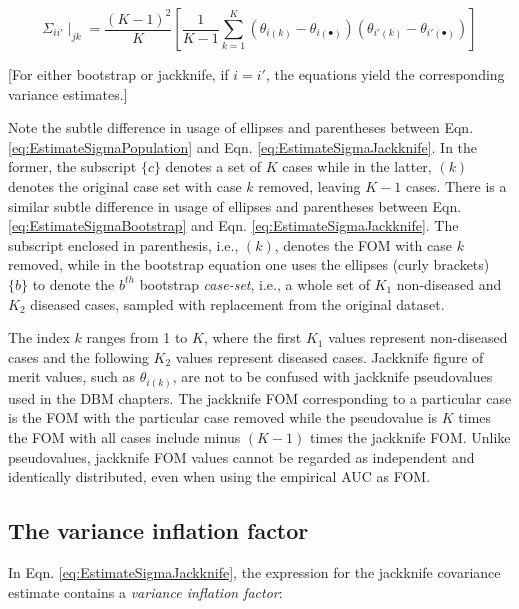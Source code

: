 \documentclass[
]{book}
\begin{document}
\begin{equation}
\Sigma_{ii'}\mid_{jk} =\frac{(K-1)^2}{K} \left [ \frac{1}{K-1}\sum_{k=1}^{K} \left ( \theta_{i(k)} - \theta_{i(\bullet)} \right) \left ( \theta_{i'(k)} - \theta_{i'(\bullet)} \right) \right ]
\label{eq:EstimateSigmaJackknife}
\end{equation}

{[}For either bootstrap or jackknife, if \(i = i'\), the equations yield the corresponding variance estimates.{]}

Note the subtle difference in usage of ellipses and parentheses between Eqn. \eqref{eq:EstimateSigmaPopulation} and Eqn. \eqref{eq:EstimateSigmaJackknife}. In the former, the subscript \(\{c\}\) denotes a set of \(K\) cases while in the latter, \((k)\) denotes the original case set with case \(k\) removed, leaving \(K-1\) cases. There is a similar subtle difference in usage of ellipses and parentheses between Eqn. \eqref{eq:EstimateSigmaBootstrap} and Eqn. \eqref{eq:EstimateSigmaJackknife}. The subscript enclosed in parenthesis, i.e., \((k)\), denotes the FOM with case \(k\) removed, while in the bootstrap equation one uses the ellipses (curly brackets) \(\{b\}\) to denote the \(b^{th}\) bootstrap \emph{case-set}, i.e., a whole set of \(K_1\) non-diseased and \(K_2\) diseased cases, sampled with replacement from the original dataset.

The index \(k\) ranges from 1 to \(K\), where the first \(K_1\) values represent non-diseased cases and the following \(K_2\) values represent diseased cases. Jackknife figure of merit values, such as \(\theta_{i(k)}\), are not to be confused with jackknife pseudovalues used in the DBM chapters. The jackknife FOM corresponding to a particular case is the FOM with the particular case removed while the pseudovalue is \(K\) times the FOM with all cases include minus \((K-1)\) times the jackknife FOM. Unlike pseudovalues, jackknife FOM values cannot be regarded as independent and identically distributed, even when using the empirical AUC as FOM.

\hypertarget{or-method-intro-elementary-stats-jack-var-inflation-factor}{%
\subsection{The variance inflation factor}\label{or-method-intro-elementary-stats-jack-var-inflation-factor}}

In Eqn. \eqref{eq:EstimateSigmaJackknife}, the expression for the jackknife covariance estimate contains a \emph{variance inflation factor}:
\end{document}
